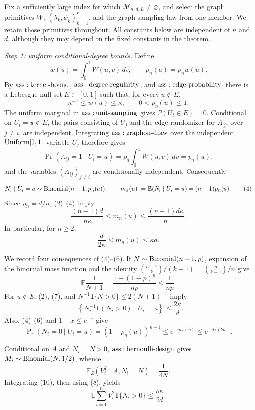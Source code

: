 Fix a sufficiently large index for which \(\mathcal M_{n,d,L}\neq\varnothing\), and select the graph primitives \(W\), \((\lambda_k,\psi_k)_{k=1}^r\), and the graph sampling law from one member.  We retain those primitives throughout.  All constants below are independent of \(n\) and \(d\), although they may depend on the fixed constants in the theorem.

\textit{Step 1: uniform conditional-degree bounds.}
Define
\[
 w(u)=\int_0^1W(u,v)\,dv,
 \qquad
 p_n(u)=\rho_nw(u).
\tag{1}
\]
By \({\rm ass:kernel\text{-}bound}\), \({\rm ass:degree\text{-}regularity}\), and \({\rm ass:edge\text{-}probability}\), there is a Lebesgue-null set \(E\subset[0,1]\) such that, for every \(u\notin E\),
\[
 \kappa^{-1}\leq w(u)\leq\kappa,
 \qquad 0<p_n(u)\leq1.
\tag{2}
\]
The uniform marginal in \({\rm ass:unit\text{-}sampling}\) gives \(P(U_i\in E)=0\).  Conditional on \(U_i=u\notin E\), the pairs consisting of \(U_j\) and the edge randomizer for \(A_{ij}\), over \(j\neq i\), are independent.  Integrating \({\rm ass:graphon\text{-}draw}\) over the independent \({\rm Uniform}[0,1]\) variable \(U_j\) therefore gives
\[
 \Pr(A_{ij}=1\mid U_i=u)
 =\rho_n\int_0^1W(u,v)\,dv=p_n(u),
\tag{3}
\]
and the variables \((A_{ij})_{j\neq i}\) are conditionally independent.  Consequently
\[
 N_i\mid U_i=u\sim{\rm Binomial}(n-1,p_n(u)),
 \qquad
 m_n(u):=\mathbb E(N_i\mid U_i=u)=(n-1)p_n(u).
\tag{4}
\]
Since \(\rho_n=d/n\), (2)--(4) imply
\[
 \frac{(n-1)d}{n\kappa}\leq m_n(u)
 \leq\frac{(n-1)d\kappa}{n}.
\tag{5}
\]
In particular, for \(n\geq2\),
\[
 \frac{d}{2\kappa}\leq m_n(u)\leq\kappa d.
\tag{6}
\]

We record four consequences of (4)--(6).  If \(N\sim{\rm Binomial}(n-1,p)\), expansion of the binomial mass function and the identity \({n-1\choose k}/(k+1)={n\choose k+1}/n\) give
\[
 \mathbb E\frac1{N+1}
 =\frac{1-(1-p)^n}{np}\leq\frac1{np}.
\tag{7}
\]
For \(u\notin E\), (2), (7), and \(N^{-1}\mathbf1\{N>0\}\leq2(N+1)^{-1}\) imply
\[
 \mathbb E\left\{N_i^{-1}\mathbf1(N_i>0)\mid U_i=u\right\}
 \leq\frac{2\kappa}{d}.
\tag{8}
\]
Also, (4)--(6) and \(1-x\leq e^{-x}\) give
\[
 \Pr(N_i=0\mid U_i=u)=(1-p_n(u))^{n-1}
 \leq e^{-m_n(u)}\leq e^{-d/(2\kappa)}.
\tag{9}
\]

Conditional on \(A\) and \(N_i=N>0\), \({\rm ass:bernoulli\text{-}design}\) gives \(M_i\sim{\rm Binomial}(N,1/2)\), whence
\[
 \mathbb E_Z(V_i^2\mid A,N_i=N)=\frac1{4N}.
\tag{10}
\]
Integrating (10), then using (8), yields
\[
 \mathbb E\sum_{i=1}^nV_i^2\mathbf1\{N_i>0\}
 \leq\frac{n\kappa}{2d}.
\tag{11}
\]


